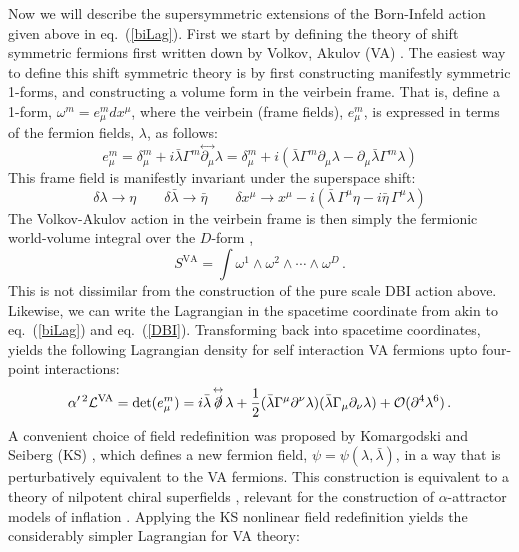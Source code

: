 \documentclass[12pt,letter]{article}
\def\eqn#1{eq.~(\ref{#1})}
\def\be{\begin{equation}}
\def\ee{\end{equation}}
\begin{document}
Now we will describe the supersymmetric extensions of the Born-Infeld action given above in \eqn{biLag}. First we start by defining the theory of shift symmetric fermions first written down by Volkov, Akulov (VA) \cite{Volkov:1973ix}. The easiest way to define this shift symmetric theory is by first constructing manifestly symmetric 1-forms, and constructing a volume form in the veirbein frame. That is, define a 1-form, $ \omega^m = e^m_\mu dx^\mu$, where the veirbein (frame fields), $e^m_\mu$, is expressed in terms of the fermion fields, $\lambda$, as follows:
 \be
 e^m_\mu = \delta^m_\mu + i \bar{\lambda} \Gamma^m\! \stackrel{\leftrightarrow}{\partial_\mu}\!  \lambda = \delta^m_\mu + i (\bar{\lambda} \Gamma^m \partial_\mu  \lambda - \partial_\mu \bar{\lambda} \Gamma^m   \lambda)
 \ee
 This frame field is manifestly invariant under the superspace shift:
\be
\delta \lambda \rightarrow \eta \qquad  \delta \bar{\lambda} \rightarrow \bar{\eta} \qquad  \delta x^\mu \rightarrow x^\mu - i (\bar{\lambda} \,\Gamma^\mu \eta- i \bar{\eta} \,\Gamma^\mu \lambda)
\ee
 The Volkov-Akulov action in the veirbein frame is then simply the fermionic world-volume integral over the $D$-form \cite{Kallosh:1997aw},
 \be
 S^{\text{VA}} = \int \omega^1 \wedge \omega^2 \wedge \cdots \wedge \omega^D\,.
 \ee
 This is not dissimilar from the construction of the pure scale DBI action above. Likewise, we can write the Lagrangian in the spacetime coordinate from akin to \eqn{biLag} and \eqn{DBI}. Transforming back into spacetime coordinates, yields the following Lagrangian density for self interaction VA fermions upto four-point interactions:
\begin{equation}
 \label{vaLag}
  \alpha'^{\,2}\mathcal{L}^{\text{VA}} = \text{det}(e^m_\mu) =  i\bar{\lambda}\!\stackrel{\leftrightarrow}{\slashed{\partial}}\!\lambda+ \frac{1}{2}(\bar{\lambda}\Gamma^\mu \partial^\nu \lambda)(\bar{\lambda}\Gamma_\mu \partial_\nu \lambda)+\mathcal{O}(\partial^4\lambda^6) 
  \,.
\end{equation}
 A convenient choice of field redefinition was proposed by Komargodski and Seiberg (KS) \cite{Komargodski:2009rz,Kuzenko:2010ef}, which defines a new fermion field, $\psi = \psi(\lambda,\bar{\lambda})$, in a way that is perturbatively equivalent to the VA fermions. This construction is equivalent to a theory of nilpotent chiral superfields \cite{Rocek:1978nb,Casalbuoni:1988xh,Ferrara:2014kva}, relevant for the construction of $\alpha$-attractor models of inflation \cite{Kallosh:2013yoa}. Applying the KS nonlinear field redefinition yields the considerably simpler Lagrangian for VA theory:
\end{document}
